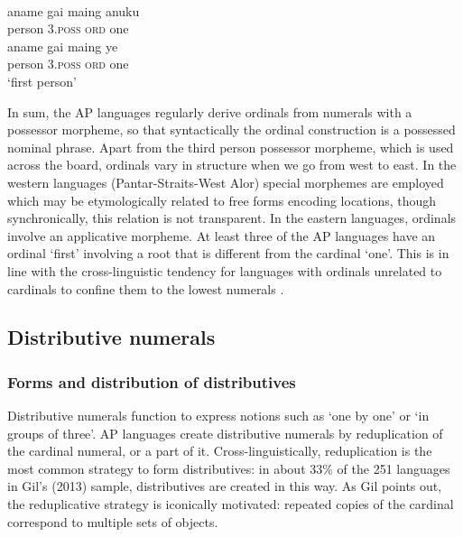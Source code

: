  


\ea%
\label{bkm:Ref342651067}
\\
 
\ea
\gll aname    gai  maing   anuku\\  
     person    3\textsc{.poss   ord } one\\ 
\ex
\gll aname    gai  maing   ye\\
    person    3\textsc{.poss   ord } one\\
\glt `first person'
\z\z
 

      

In sum, the AP languages regularly derive ordinals from numerals with a possessor morpheme, so that syntactically the ordinal construction is a possessed nominal phrase. Apart from the third person possessor morpheme, which is used across the board, ordinals vary in structure when we go from west to east. In the western languages (Pantar-Straits-West Alor) special morphemes are employed which may be etymologically related to free forms encoding locations, though synchronically, this relation is not transparent. In the eastern languages, ordinals involve an applicative morpheme. At least three of the AP languages have an ordinal `first' involving a root that is different from the cardinal `one'. This is in line with the cross-linguistic tendency for languages with ordinals unrelated to cardinals to confine them to the lowest numerals \citep{StolzEtAl2013}.

\subsection{Distributive numerals}
\label{sec:8:Distributive}
\subsubsection{Forms and distribution of distributives}
Distributive numerals function to express notions such as `one by one' or `in groups of three'. AP languages create distributive numerals by reduplication of the cardinal numeral, or a part of it. Cross-linguistically, reduplication is the most common strategy to form distributives: in about 33\% of the 251 languages in Gil's (2013) \nocite{Gil2013} sample, distributives are created in this way. As Gil points out, the reduplicative strategy is iconically motivated: repeated copies of the cardinal correspond to multiple sets of objects.

